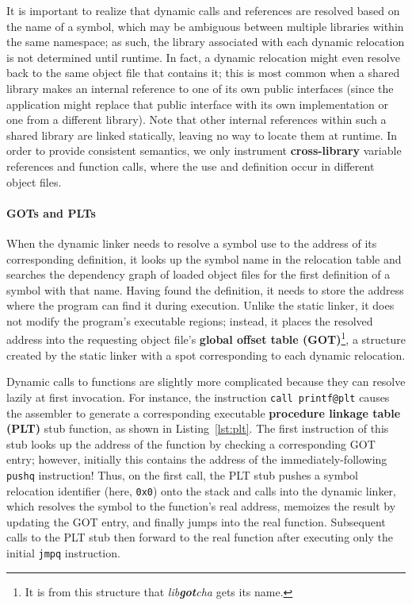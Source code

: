 It is important to realize that dynamic calls and references are resolved based on
the name of a symbol, which may be ambiguous between multiple libraries within the
same namespace; as such, the library associated with each dynamic relocation is not
determined until runtime.  In fact, a dynamic relocation might even resolve back to
the same object file that contains it; this is most common when a shared library
makes an internal reference to one of its own public interfaces (since the
application might replace that public interface with its own implementation or one
from a different library).  Note that other internal references within such a shared
library are linked statically, leaving no way to locate them at runtime.  In order to
provide consistent semantics, we only instrument \textbf{cross-library} variable
references and function calls, where the use and definition occur in different object
files.

\paragraph{GOTs and PLTs}

When the dynamic linker needs to resolve a symbol use to the address of its
corresponding definition, it looks up the symbol name in the relocation table and
searches the dependency graph of loaded object files for the first definition of a
symbol with that name.  Having found the definition, it needs to store the address
where the program can find it during execution.  Unlike the static linker, it does
not modify the program's executable regions; instead, it places the resolved address
into the requesting object file's \textbf{global offset table (GOT)}\footnote{It is
from this structure that \textit{lib\textbf{got}cha} gets its name.}, a structure
created by the static linker with a spot corresponding to each dynamic relocation.

Dynamic calls to functions are slightly more complicated because they can resolve
lazily at first invocation.  For instance, the instruction
\texttt{call~printf@plt} causes the assembler to generate a corresponding executable
\textbf{procedure linkage table (PLT)} stub function, as shown in
Listing~\ref{lst:plt}.  The first instruction of this stub looks up the address of
the
function by checking a corresponding GOT entry; however, initially this contains the
address of the immediately-following \texttt{pushq} instruction!  Thus, on the first
call, the PLT stub pushes a symbol relocation identifier (here, \texttt{0x0}) onto
the stack and calls into the dynamic linker, which resolves the symbol to the
function's real address, memoizes the result by updating the GOT entry, and finally
jumps into the real function.  Subsequent calls to the PLT stub then forward to the
real function after executing only the initial \texttt{jmpq} instruction.


